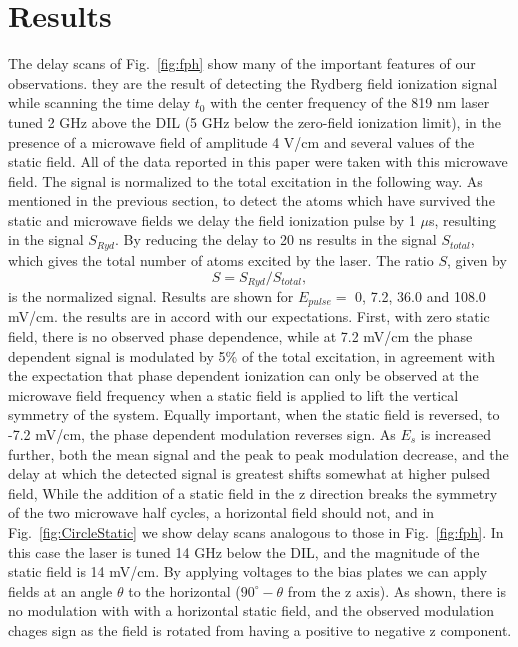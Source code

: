 \documentclass[aps,pra,preprint,groupedaddress]{revtex4-1}
\begin{document}
\section{\label{results} Results}

The delay scans of Fig.~\ref{fig:fph} show many of the important features of our observations. they are the result of detecting the Rydberg field ionization signal while scanning the time delay $t_0$ with the center frequency of the 819 nm laser tuned 2 GHz above the DIL (5 GHz below the zero-field ionization limit), in the presence of a microwave field of amplitude 4 V/cm and several values of the static field. All of the data reported in this paper were taken with this microwave field. The signal is normalized to the total excitation in the following way. As mentioned in the previous section, to detect the atoms which have survived the static and microwave fields we delay the field ionization pulse by 1 $\mu$s, resulting in the signal $S_{Ryd}$. By reducing the delay to 20 ns results in the signal $S_{total}$, which gives the total number of atoms excited by the laser. The ratio $S$, given by
\begin{equation} \label{eq:norm}
S=S_{Ryd}/S_{total},
\end{equation}
is the normalized signal. Results are shown for $E_{pulse} =$ 0, 7.2, 36.0 and 108.0 mV/cm. the results are in accord with our expectations. First, with zero static field, there is no observed phase dependence, while at 7.2 mV/cm the phase dependent signal is modulated by 5\% of the total excitation, in agreement with the expectation that phase dependent ionization can only be observed at the microwave field frequency when a static field is applied to lift the vertical symmetry of the system. Equally important, when the static field is reversed, to -7.2 mV/cm, the phase dependent modulation reverses sign. As $E_s$ is increased further, both the mean signal and the peak to peak modulation decrease, and the delay at which the detected signal is greatest shifts somewhat at higher pulsed field,
While the addition of a static field in the z direction breaks the symmetry of the two microwave half cycles, a horizontal field should not, and in Fig.~\ref{fig:CircleStatic} we show delay scans analogous to those in Fig.~\ref{fig:fph}. In this case the laser is tuned 14 GHz below the DIL, and the magnitude of the static field is 14 mV/cm. By applying voltages to the bias plates we can apply fields at an angle $\theta$ to the horizontal ($90^{\circ}-\theta$ from the z axis). As shown, there is no modulation with with a horizontal static field, and the observed modulation chages sign as the field is rotated from having a positive to negative z component.
\end{document}
